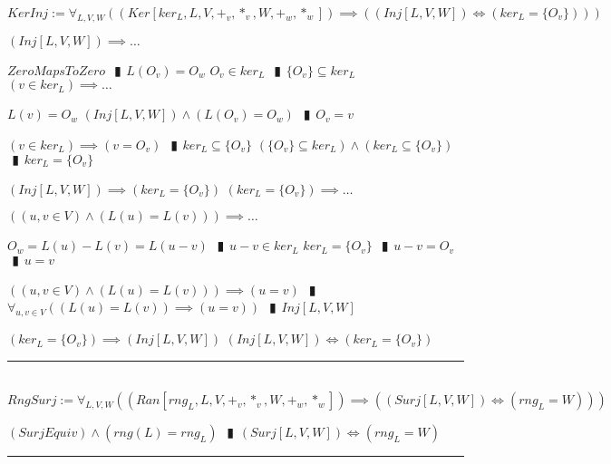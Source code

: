 \documentclass{book}
\newcommand{\abr}{:=}
\newcommand{\pipe}{$\phantom{(}\vrectangleblack\phantom{)}$}
\begin{document}
$KerInj \abr \forall_{L, V, W}((Ker[ker_L, L, V, +_v, *_v, W, +_w, *_w]) \implies ((Inj[L, V, W]) \iff (ker_L = \{O_v\})))$
\begin{enumerate}
  \lit $(Inj[L, V, W]) \implies \ldots$
  \begin{enumerate}
    \lit $ZeroMapsToZero$ \pipe $L(O_v) = O_w$
    \lit $O_v \in ker_L$ \pipe $\{O_v\} \subseteq ker_L$
    \lit $(v \in ker_L) \implies \ldots$
    \begin{enumerate}
      \lit $L(v) = O_w$
      \lit $(Inj[L, V, W]) \land (L(O_v) = O_w)$ \pipe $O_v = v$
    \end{enumerate}
    \lit $(v \in ker_L) \implies (v = O_v)$ \pipe $ker_L \subseteq \{O_v\}$
    \lit $(\{O_v\} \subseteq ker_L) \land (ker_L \subseteq \{O_v\})$ \pipe $ker_L = \{O_v\}$
  \end{enumerate}
  \lit $(Inj[L, V, W]) \implies (ker_L = \{O_v\})$
  \lit $(ker_L = \{O_v\}) \implies \ldots$
  \begin{enumerate}
    \lit $((u, v \in V) \land (L(u) = L(v))) \implies \ldots$
    \begin{enumerate}
      \lit $O_w = L(u) - L(v) = L(u - v)$ \pipe $u - v \in ker_L$
      \lit $ker_L = \{O_v\}$ \pipe $u - v = O_v$ \pipe $u = v$
    \end{enumerate}
    \lit $((u, v \in V) \land (L(u) = L(v))) \implies (u = v)$ \pipe $\forall_{u, v \in V}((L(u) = L(v)) \implies (u = v))$ \pipe $Inj[L, V, W]$
  \end{enumerate}
  \lit $(ker_L = \{O_v\}) \implies (Inj[L, V, W])$
  \lit $(Inj[L, V, W]) \iff (ker_L = \{O_v\})$
\end{enumerate} \vspace{.75mm} \hrule \vspace{.75mm} \ \\ 

$RngSurj \abr \forall_{L, V, W}((Ran[rng_L, L, V, +_v, *_v, W, +_w, *_w]) \implies ((Surj[L, V, W]) \iff (rng_L = W)))$
\begin{enumerate}
  \lit $(SurjEquiv) \land (rng(L) = rng_L)$ \pipe $(Surj[L, V, W]) \iff (rng_L = W)$
\end{enumerate} \vspace{.75mm} \hrule \vspace{.75mm} \ \\ 
\end{document}
